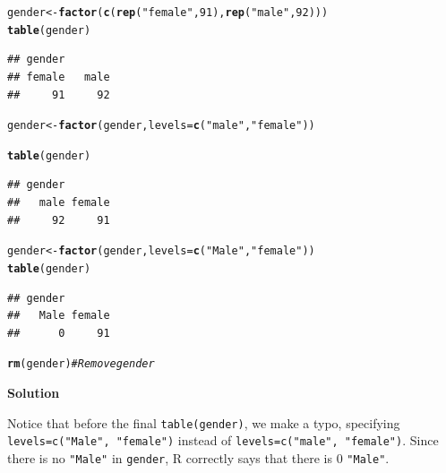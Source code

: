 \documentclass{article}\usepackage[]{graphicx}\usepackage[]{color}
\makeatletter
\newcommand{\hlnum}[1]{\textcolor[rgb]{0.686,0.059,0.569}{#1}}%
\newcommand{\hlstr}[1]{\textcolor[rgb]{0.192,0.494,0.8}{#1}}%
\newcommand{\hlcom}[1]{\textcolor[rgb]{0.678,0.584,0.686}{\textit{#1}}}%
\newcommand{\hlstd}[1]{\textcolor[rgb]{0.345,0.345,0.345}{#1}}%
\newcommand{\hlkwb}[1]{\textcolor[rgb]{0.69,0.353,0.396}{#1}}%
\newcommand{\hlkwc}[1]{\textcolor[rgb]{0.333,0.667,0.333}{#1}}%
\newcommand{\hlkwd}[1]{\textcolor[rgb]{0.737,0.353,0.396}{\textbf{#1}}}%
\newenvironment{kframe}{%
 \def\at@end@of@kframe{}%
 \ifinner\ifhmode%
  \def\at@end@of@kframe{\end{minipage}}%
  \begin{minipage}{\columnwidth}%
 \fi\fi%
 \def\FrameCommand##1{\hskip\@totalleftmargin \hskip-\fboxsep
 \colorbox{shadecolor}{##1}\hskip-\fboxsep
     \hskip-\linewidth \hskip-\@totalleftmargin \hskip\columnwidth}%
 \MakeFramed {\advance\hsize-\width
   \@totalleftmargin\z@ \linewidth\hsize
   \@setminipage}}%
 {\par\unskip\endMakeFramed%
 \at@end@of@kframe}
\newenvironment{knitrout}{}{} %
\makeatother
\begin{document}
\begin{knitrout}
\color{fgcolor}\begin{kframe}
\begin{alltt}
\hlstd{gender} \hlkwb{<-} \hlkwd{factor}\hlstd{(}\hlkwd{c}\hlstd{(}\hlkwd{rep}\hlstd{(}\hlstr{"female"}\hlstd{,} \hlnum{91}\hlstd{),} \hlkwd{rep}\hlstd{(}\hlstr{"male"}\hlstd{,} \hlnum{92}\hlstd{)))}
\hlkwd{table}\hlstd{(gender)}
\end{alltt}
\begin{verbatim}
## gender
## female   male 
##     91     92
\end{verbatim}
\begin{alltt}
\hlstd{gender} \hlkwb{<-} \hlkwd{factor}\hlstd{(gender,} \hlkwc{levels}\hlstd{=}\hlkwd{c}\hlstd{(}\hlstr{"male"}\hlstd{,} \hlstr{"female"}\hlstd{))}
\end{alltt}
\end{kframe}
\end{knitrout}
\begin{knitrout}
\color{fgcolor}\begin{kframe}
\begin{alltt}
\hlkwd{table}\hlstd{(gender)}
\end{alltt}
\begin{verbatim}
## gender
##   male female 
##     92     91
\end{verbatim}
\begin{alltt}
\hlstd{gender} \hlkwb{<-} \hlkwd{factor}\hlstd{(gender,} \hlkwc{levels}\hlstd{=}\hlkwd{c}\hlstd{(}\hlstr{"Male"}\hlstd{,} \hlstr{"female"}\hlstd{))}
\hlkwd{table}\hlstd{(gender)}
\end{alltt}
\begin{verbatim}
## gender
##   Male female 
##      0     91
\end{verbatim}
\begin{alltt}
\hlkwd{rm}\hlstd{(gender)}                  \hlcom{# Remove gender}
\end{alltt}
\end{kframe}
\end{knitrout}

\textbf{Solution}

Notice that before the final \verb`table(gender)`, we make a typo, specifying \verb`levels=c("Male", "female")` instead of \verb`levels=c("male", "female")`. Since there is no \verb`"Male"` in \verb`gender`, R correctly says that there is 0 \verb`"Male"`.
\end{document}
